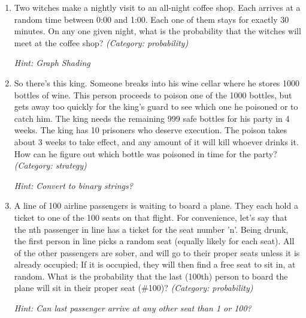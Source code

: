 \begin{enumerate}

\item Two witches make a nightly visit to an all-night coffee shop. Each arrives at a random time between 0:00 and 1:00. Each one of them stays for exactly 30 minutes. On any one given night, what is the probability that the witches will meet at the coffee shop?
\small\emph{(Category: probability)}

\small\emph{Hint: Graph Shading}





\item So there's this king. Someone breaks into his wine cellar where he stores 1000 bottles of wine. This person proceeds to poison one of the 1000 bottles, but gets away too quickly for the king's guard to see which one he poisoned or to catch him.
The king needs the remaining 999 safe bottles for his party in 4 weeks. The king has 10 prisoners who deserve execution. The poison takes about 3 weeks to take effect, and any amount of it will kill whoever drinks it. How can he figure out which bottle was poisoned in time for the party?
\small\emph{(Category: strategy)}

\small\emph{Hint: Convert to binary strings?}





\item A line of 100 airline passengers is waiting to board a plane. They each hold a ticket to one of the 100 seats on that flight. For convenience, let's say that the nth passenger in line has a ticket for the seat number 'n'. Being drunk, the first person in line picks a random seat (equally likely for each seat). All of the other passengers are sober, and will go to their proper seats unless it is already occupied; If it is occupied, they will then find a free seat to sit in, at random.
What is the probability that the last (100th) person to board the plane will sit in their proper seat (\#100)?
\small\emph{(Category: probability)}

\small\emph{Hint: Can last passenger arrive at any other seat than 1 or 100?}


\end{enumerate}
